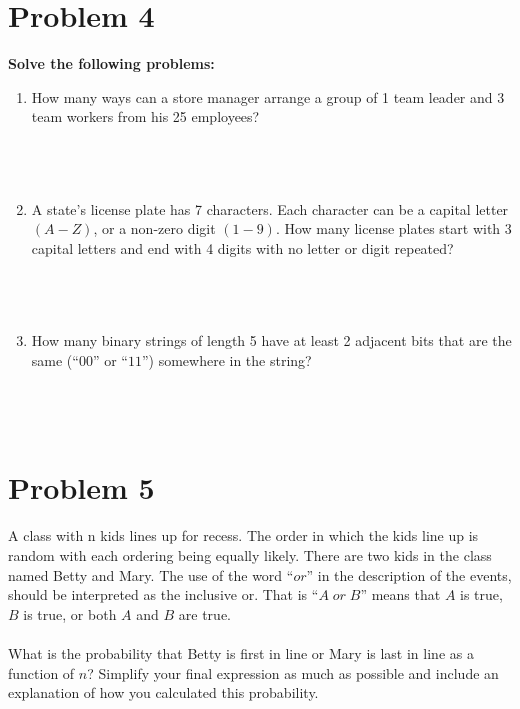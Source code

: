 \documentclass{amsart}
\theoremstyle{definition}
\theoremstyle{Exercise}
\theoremstyle{remark}
\theoremstyle{rule}
\numberwithin{equation}{section}
\begin{document}
  \section*{}
  \section*{Problem 4}
  {\bf Solve the following problems:}
  \begin{enumerate}[label=(\alph*)]
    \item How many ways can a store manager arrange a group of 1 team leader and 3 team workers from his 25 employees?
\\\\
\\\\
    \item A state’s license plate has 7 characters. Each character can be a capital letter $(A-Z)$, or a non-zero digit $(1-9)$. How many license plates start with 3 capital letters and end with 4 digits with no letter or digit repeated?
\\\\
\\\\
    \item How many binary strings of length 5 have at least 2 adjacent bits that are the same (``$00$'' or ``$11$'') somewhere in the string?
\\\\
\\\\
  \end{enumerate}
\newpage
  \section*{}
  \section*{}
  \section*{Problem 5}
  A class with n kids lines up for recess. The order in which the kids line up is random with each ordering being equally likely. There are two kids in the class named Betty and Mary. The use of the word ``$or$'' in the description of the events, should be interpreted as the inclusive or. That is ``$A \;or\; B$'' means that $A$ is true, $B$ is true, or both $A$ and $B$ are true.\\\\
  What is the probability that Betty is first in line or Mary is last in line as a function of $n$? Simplify your final expression as much as possible and include an explanation of how you calculated this probability.
\\\\
\\\\
  \newpage
\end{document}
